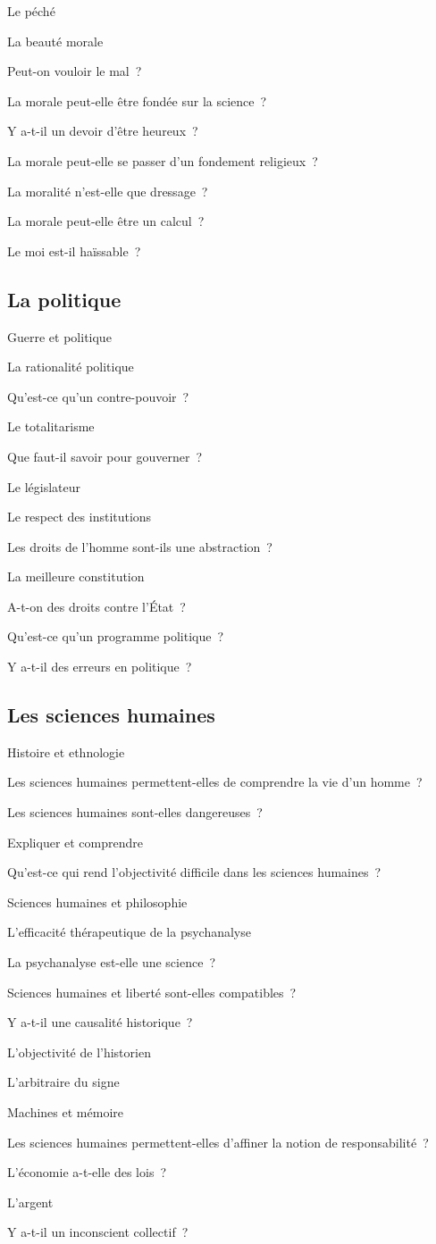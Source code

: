 \documentclass[a4paper]{article}
\begin{document}
Le péché

La beauté morale

Peut-on vouloir le mal ?

La morale peut-elle être fondée sur la science ?

Y a-t-il un devoir d'être heureux ?

La morale peut-elle se passer d'un fondement religieux ?

La moralité n'est-elle que dressage ?

La morale peut-elle être un calcul ?

Le moi est-il haïssable ?

\subsection{La politique}
\label{sec-6-5}

Guerre et politique

La rationalité politique

Qu'est-ce qu'un contre-pouvoir ?

Le totalitarisme

Que faut-il savoir pour gouverner ?

Le législateur

Le respect des institutions

Les droits de l'homme sont-ils une abstraction ?

La meilleure constitution

A-t-on des droits contre l'État ?

Qu'est-ce qu'un programme politique ?

Y a-t-il des erreurs en politique ?

\subsection{Les sciences humaines}
\label{sec-6-6}

Histoire et ethnologie

Les sciences humaines permettent-elles de comprendre la vie d'un homme ?

Les sciences humaines sont-elles dangereuses ?

Expliquer et comprendre

Qu'est-ce qui rend l'objectivité difficile dans les sciences humaines ?

Sciences humaines et philosophie

L'efficacité thérapeutique de la psychanalyse

La psychanalyse est-elle une science ?

Sciences humaines et liberté sont-elles compatibles ?

Y a-t-il une causalité historique ?

L'objectivité de l'historien

L'arbitraire du signe

Machines et mémoire

Les sciences humaines permettent-elles d'affiner la notion de
responsabilité ?

L'économie a-t-elle des lois ?

L'argent

Y a-t-il un inconscient collectif ?
\end{document}
